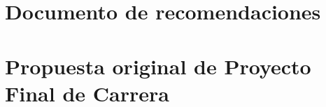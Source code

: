 %
\appendix
%
\chapter{Documento de recomendaciones}

%
\chapter{Propuesta original de Proyecto Final de Carrera}

%
